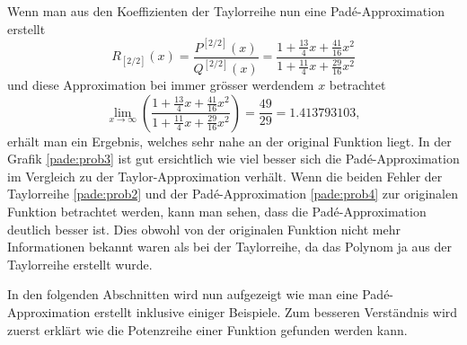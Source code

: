 Wenn man aus den Koeffizienten der Taylorreihe nun eine Padé-Approximation erstellt 
\begin{equation*}
R_{[2/ 2]}(x)
=
\frac{P^{[2/2]}(x)}{Q^{[2/2]}(x)}
=
\frac{1+\frac{13}{4}x+\frac{41}{16}x^2}{1 + \frac{11}{4}x + \frac{29}{16}x^2} 
\label{pade:bspordnung2}
\end{equation*}
und diese Approximation bei immer grösser werdendem $x$ betrachtet
\begin{equation*}
\lim_{x \to \infty}
\left(
\frac{1+\frac{13}{4}x+\frac{41}{16}x^2}{1 + \frac{11}{4}x + \frac{29}{16}x^2} 
\right)
=
\frac{49}{29} = 1.413793103,
\end{equation*}
erhält man ein Ergebnis, welches sehr nahe an der original Funktion liegt. 
In der Grafik \ref{pade:prob3} ist gut ersichtlich wie viel besser sich die Padé-Approximation im Vergleich zu der Taylor-Approximation verhält.
Wenn die beiden Fehler der Taylorreihe \ref{pade:prob2} und der Padé-Approximation \ref{pade:prob4} zur originalen Funktion betrachtet werden, kann man sehen, dass die Padé-Approximation deutlich besser ist.
Dies obwohl von der originalen Funktion nicht mehr Informationen bekannt waren als bei der Taylorreihe, da das Polynom ja aus der Taylorreihe erstellt wurde.

In den folgenden Abschnitten wird nun aufgezeigt wie man eine Padé-Approximation erstellt inklusive einiger Beispiele.
Zum besseren Verständnis wird zuerst erklärt wie die Potenzreihe einer Funktion gefunden werden kann.










